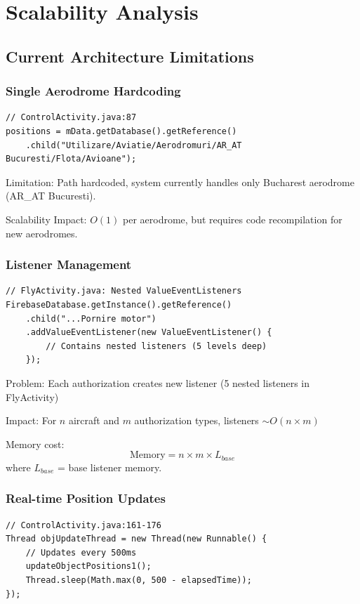 \documentclass[11pt,a4paper]{report}
\begin{document}
\chapter{Scalability Analysis}

\section{Current Architecture Limitations}

\subsection{Single Aerodrome Hardcoding}

\begin{lstlisting}
// ControlActivity.java:87
positions = mData.getDatabase().getReference()
    .child("Utilizare/Aviatie/Aerodromuri/AR_AT Bucuresti/Flota/Avioane");
\end{lstlisting}

Limitation: Path hardcoded, system currently handles only Bucharest aerodrome (AR\_AT Bucuresti).

Scalability Impact: $O(1)$ per aerodrome, but requires code recompilation for new aerodromes.

\subsection{Listener Management}

\begin{lstlisting}
// FlyActivity.java: Nested ValueEventListeners
FirebaseDatabase.getInstance().getReference()
    .child("...Pornire motor")
    .addValueEventListener(new ValueEventListener() {
        // Contains nested listeners (5 levels deep)
    });
\end{lstlisting}

Problem: Each authorization creates new listener (5 nested listeners in FlyActivity)

Impact: For $n$ aircraft and $m$ authorization types, listeners $\sim O(n \times m)$

Memory cost:
\[
\text{Memory} = n \times m \times L_{base}
\]
where $L_{base}$ = base listener memory.

\subsection{Real-time Position Updates}

\begin{lstlisting}
// ControlActivity.java:161-176
Thread objUpdateThread = new Thread(new Runnable() {
    // Updates every 500ms
    updateObjectPositions1();
    Thread.sleep(Math.max(0, 500 - elapsedTime));
});
\end{lstlisting}
\end{document}
